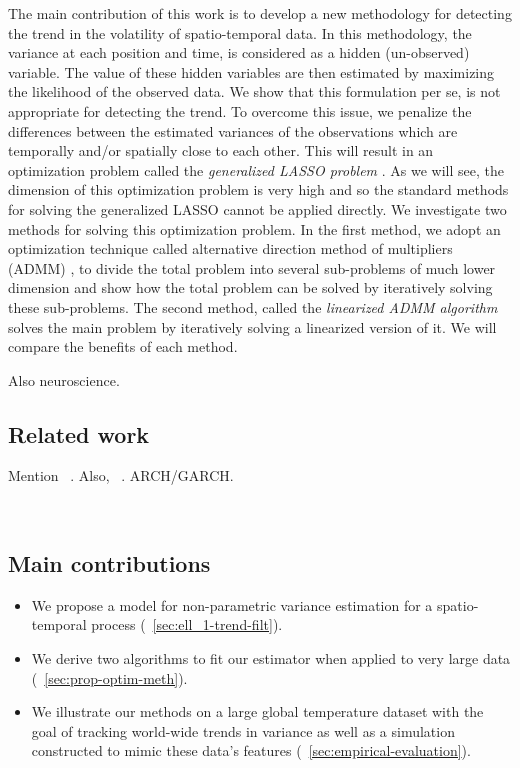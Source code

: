 \documentclass{article}
\begin{document}
The main contribution of this work is to develop a new methodology for
detecting the trend in the volatility of spatio-temporal data. In this
methodology, the variance at each position and time, is considered as
a hidden (un-observed) variable. The value of these hidden variables
are then estimated by maximizing the likelihood of the observed
data. We show that this formulation per se, is not appropriate for
detecting the trend. To overcome this issue, we penalize the
differences between the estimated variances of the observations which
are temporally and/or spatially close to each other. This will result
in an optimization problem called the \textit{generalized LASSO
  problem} \citep{tibshirani_solution_2011}. As we will see, the
dimension of this optimization problem is very high and so the
standard methods for solving the generalized LASSO cannot be applied
directly. We investigate two methods for solving this optimization
problem. In the first method, we adopt an optimization technique
called alternative direction method of multipliers (ADMM)
\citep{boyd_distributed_2011}, to divide the total problem into
several sub-problems of much lower dimension and show how the total
problem can be solved by iteratively solving these sub-problems. The
second method, called the \textit{linearized ADMM algorithm}
\citep{parikh_proximal_2014} solves the main problem by iteratively
solving a linearized version of it. We will compare the benefits of
each method. 

Also neuroscience.


\subsection{Related work}

Mention ~\citep{KimKoh2009,HallacPark2017}. Also,
~\citep{Tibshirani2014,TibshiraniTaylor2011}. ARCH/GARCH. 

\citep{SadhanalaWang2017,LinSharpnack2017,WangSharpnack2016}~\citep{RamdasTibshirani2016}

\subsection{Main contributions}

\begin{itemize}
\item We propose a model for non-parametric variance estimation for a
  spatio-temporal process (~\autoref{sec:ell_1-trend-filt}).
\item We derive two algorithms to fit our estimator when applied to
  very large data (~\autoref{sec:prop-optim-meth}).
\item We illustrate our methods on a large global temperature dataset
  with the goal of tracking world-wide trends in variance as well as a
  simulation constructed to mimic these data's features
  (~\autoref{sec:empirical-evaluation}). 
\end{itemize}
\end{document}
